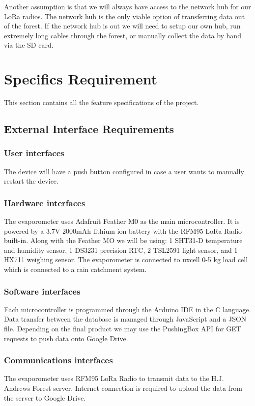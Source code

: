 \documentclass[onecolumn, draftclsnofoot,10pt, compsoc]{IEEEtran}
\begin{document}
Another assumption is that we will always have access to the network hub for our LoRa radios.  The network hub is the only viable option of transferring data out of the forest.  If the network hub is out we will need to setup our own hub, run extremely long cables through the forest, or manually collect the data by hand via the SD card.
\section{Specifics Requirement}
This section contains all the feature specifications of the project.

\subsection{External Interface Requirements}
\subsubsection{User interfaces}
The device will have a push button configured in case a user wants to manually restart the device.

\subsubsection{Hardware interfaces}
The evaporometer uses Adafruit Feather M0 as the main microcontroller. It is powered by a 3.7V 2000mAh lithium ion battery with the RFM95 LoRa Radio built-in.  Along with the Feather MO we will be using: 1 SHT31-D temperature and humidity sensor, 1 DS3231 precision RTC, 2 TSL2591 light sensor, and 1 HX711 weighing sensor. The evaporometer is connected to uxcell 0-5 kg load cell which is connected to a rain catchment system.

\subsubsection{Software interfaces}
Each microcontroller is programmed through the Arduino IDE in the C language.  Data transfer between the database is managed through JavaScript and a JSON file.  Depending on the final product we may use the PushingBox API for GET requests to push data onto Google Drive.

\subsubsection{Communications interfaces}
The evaporometer uses RFM95 LoRa Radio to transmit data to the H.J. Andrews Forest server. 
Internet connection is required to upload the data from the server to Google Drive.
\end{document}
